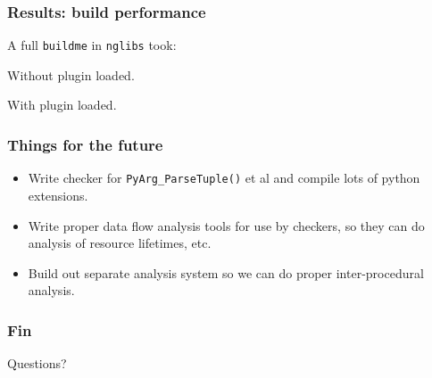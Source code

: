 \documentclass{beamer}
\begin{document}
\frame
{
  \frametitle{Results: build performance}

  A full \texttt{buildme} in \texttt{nglibs} took:
  
  \begin{description}
    \item<2->[119 CPU seconds] Without plugin loaded.
    \item<3->[134 CPU seconds] With plugin loaded.
  \end{description}
}

\frame
{
  \frametitle{Things for the future}

  \begin{itemize}
    \item<1-> Write checker for \texttt{PyArg\_ParseTuple()} et al and compile
              lots of python extensions.
    \item<2-> Write proper data flow analysis tools for use by checkers, so they can do
              analysis of resource lifetimes, etc.
    \item<3-> Build out separate analysis system so we can do proper inter-procedural
              analysis.
  \end{itemize}
}

\frame
{
  \frametitle{Fin}
  Questions?
}
\end{document}

